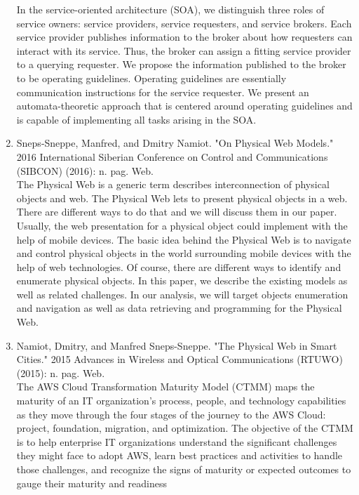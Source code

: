 \documentclass[oneside,a4paper,12pt]{report}
\begin{document}
\begin{enumerate}
In the service-oriented architecture (SOA), we distinguish three roles of service owners: service providers, service requesters, and service brokers. Each service provider publishes information to the broker about how requesters can interact with its service. Thus, the broker can assign a fitting service provider to a querying requester. We propose the information published to the broker to be operating guidelines. Operating guidelines are essentially communication instructions for the service requester.
We present an automata-theoretic approach that is centered around operating guidelines and is capable of implementing all tasks arising in the SOA.\\

\item Sneps-Sneppe, Manfred, and Dmitry Namiot. "On Physical Web Models." 2016 International Siberian Conference on Control and Communications (SIBCON) (2016): n. pag. Web.\\
The Physical Web is a generic term describes interconnection of physical objects and web. The Physical Web lets to present physical objects in a web. There are different ways
to do that and we will discuss them in our paper. Usually, the web presentation for a physical object could implement with the help of mobile devices. The basic idea behind the Physical Web is to navigate and control physical objects in the world surrounding
mobile devices with the help of web technologies. Of course, there are different ways to identify and enumerate physical objects. In this paper, we describe the existing models as well as related challenges. In our analysis, we will target objects enumeration
and navigation as well as data retrieving and programming for the Physical Web. \\
\item Namiot, Dmitry, and Manfred Sneps-Sneppe. "The Physical Web in Smart Cities." 2015 Advances in Wireless and Optical Communications (RTUWO) (2015): n. pag. Web.\\
The AWS Cloud Transformation Maturity Model (CTMM) maps the maturity of
an IT organization’s process, people, and technology capabilities as they move
through the four stages of the journey to the AWS Cloud: project, foundation,
migration, and optimization. The objective of the CTMM is to help enterprise IT
organizations understand the significant challenges they might face to adopt
AWS, learn best practices and activities to handle those challenges, and recognize
the signs of maturity or expected outcomes to gauge their maturity and readiness

\end{enumerate}
\end{document}
